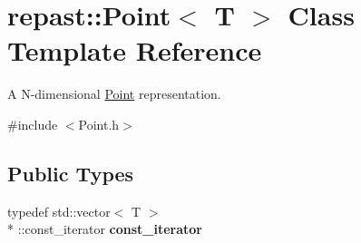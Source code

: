 \hypertarget{classrepast_1_1_point}{\section{repast\-:\-:Point$<$ T $>$ Class Template Reference}
\label{classrepast_1_1_point}
}


A N-\/dimensional \hyperlink{classrepast_1_1_point}{Point} representation.  




{\ttfamily \#include $<$Point.\-h$>$}

\subsection*{Public Types}
\begin{DoxyCompactItemize}
\item 
\hypertarget{classrepast_1_1_point_a5b7b0786c5ac836e6ddfcda1dec866dc}{typedef std\-::vector$<$ T $>$\\*
\-::const\-\_\-iterator {\bfseries const\-\_\-iterator}}\label{classrepast_1_1_point_a5b7b0786c5ac836e6ddfcda1dec866dc}

\end{DoxyCompactItemize}
